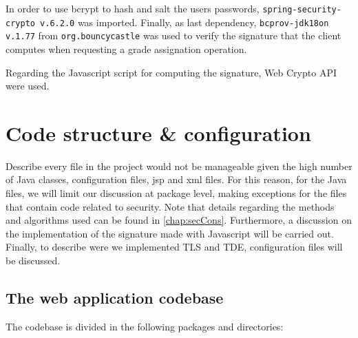 \noindent In order to use bcrypt to hash and salt the users passwords, \texttt{spring-security-crypto v.6.2.0} was imported. Finally, as last dependency, \texttt{bcprov-jdk18on v.1.77} from \texttt{org.bouncycastle} was used to verify the signature that the client computes when requesting a grade assignation operation.

\noindent Regarding the Javascript script for computing the signature, Web Crypto API were used.

\section{Code structure \& configuration}

Describe every file in the project would not be manageable given the high number of Java classes, configuration files, jsp and xml files. For this reason, for the Java files, we will limit our discussion at package level, making exceptions for the files that contain code related to security. Note that details regarding the methods and algorithms used can be found in \autoref{chap:secCons}. Furthermore, a discussion on the implementation of the signature made with Javascript will be carried out. Finally, to describe were we implemented TLS and TDE, configuration files will be discussed.

\subsection*{The web application codebase}

The codebase is divided in the following packages and directories:

